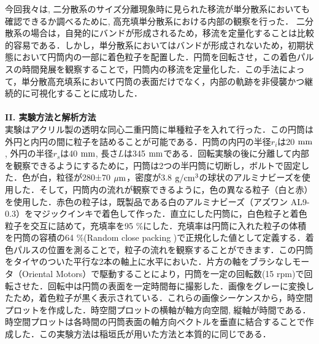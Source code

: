 \documentclass[prl,twocolumn,superscriptaddress]{revtex4}
\begin{document}
今回我々は, 二分散系のサイズ分離現象時に見られた移流が単分散系においても確認できるか調べるために, 高充填単分散系における内部の観察を行った． 二分散系の場合は，自発的にバンドが形成されるため，移流を定量化することは比較的容易である．しかし，単分散系においてはバンドが形成されないため，初期状態において円筒内の一部に着色粒子を配置した．円筒を回転させ，この着色パルスの時間発展を観察することで，円筒内の移流を定量化した．この手法によって，単分散高充填系において円筒の表面だけでなく，内部の軌跡を非侵襲かつ継続的に可視化することに成功した．\\
\\
{\bf I\hspace{-.1em}I. 実験方法と解析方法} \\
	実験はアクリル製の透明な同心二重円筒に単種粒子を入れて行った．この円筒は外円と内円の間に粒子を詰めることが可能である．円筒の内円の半径$r_i$は20 $\rm{mm}$, 外円の半径$r_s$は40 $\rm{mm}$, 長さ$L$は345 $\rm{mm}$である．回転実験の後に分離して内部を観察できるようにするために，円筒は2つの半円筒に切断し，ボルトで固定した．色が白，粒径が280±70 $\rm{\mu m}$，密度が3.8 $\rm{g/cm^3}$の球状のアルミナビーズを使用した．そして，円筒内の流れが観察できるように，色の異なる粒子（白と赤）を使用した．赤色の粒子は，既製品である白のアルミナビーズ（アズワン AL9-0.3）をマジックインキで着色して作った．直立にした円筒に，白色粒子と着色粒子を交互に詰めて，充填率を95 $\%$にした．充填率は円筒に入れた粒子の体積を円筒の容積の64 $\%$(Random close packing \cite{Pouliquen97:RCP})で正規化した値として定義する．着色パルスの位置を測ることで，粒子の流れを観察することができます．この円筒をタイヤのついた平行な2本の軸上に水平においた．片方の軸をブラシなしモータ（Oriental Motors）で駆動することにより，円筒を一定の回転数(15 \rm{rpm})で回転させた．回転中は円筒の表面を一定時間毎に撮影した．画像をグレーに変換したため，着色粒子が黒く表示されている．これらの画像シーケンスから，時空間プロットを作成した．時空間プロットの横軸が軸方向空間, 縦軸が時間である．時空間プロットは各時間の円筒表面の軸方向ベクトルを垂直に結合することで作成した．この実験方法は稲垣氏\cite{Inagaki15}が用いた方法と本質的に同じである．\\

\end{document}
